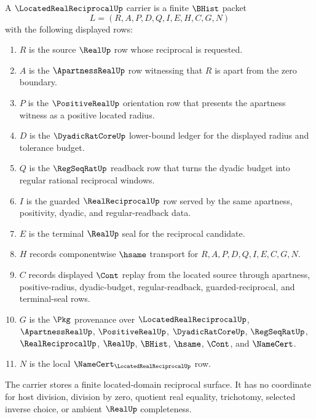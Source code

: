 \begin{definition}
\label{def:located-real-reciprocal-carrier}
A $\LocatedRealReciprocalUp$ carrier is a finite $\BHist$ packet
$$
L=(R,A,P,D,Q,I,E,H,C,G,N)
$$
with the following displayed rows:
\begin{enumerate}
\item $R$ is the source $\RealUp$ row whose reciprocal is requested.
\item $A$ is the $\ApartnessRealUp$ row witnessing that $R$ is apart from the zero boundary.
\item $P$ is the $\PositiveRealUp$ orientation row that presents the apartness witness as a positive located radius.
\item $D$ is the $\DyadicRatCoreUp$ lower-bound ledger for the displayed radius and tolerance budget.
\item $Q$ is the $\RegSeqRatUp$ readback row that turns the dyadic budget into regular rational reciprocal windows.
\item $I$ is the guarded $\RealReciprocalUp$ row served by the same apartness, positivity, dyadic, and regular-readback data.
\item $E$ is the terminal $\RealUp$ seal for the reciprocal candidate.
\item $H$ records componentwise $\hsame$ transport for $R,A,P,D,Q,I,E,C,G,N$.
\item $C$ records displayed $\Cont$ replay from the located source through apartness, positive-radius, dyadic-budget, regular-readback, guarded-reciprocal, and terminal-seal rows.
\item $G$ is the $\Pkg$ provenance over $\LocatedRealReciprocalUp$, $\ApartnessRealUp$, $\PositiveRealUp$, $\DyadicRatCoreUp$, $\RegSeqRatUp$, $\RealReciprocalUp$, $\RealUp$, $\BHist$, $\hsame$, $\Cont$, and $\NameCert$.
\item $N$ is the local $\NameCert_{\LocatedRealReciprocalUp}$ row.
\end{enumerate}
The carrier stores a finite located-domain reciprocal surface. It has no coordinate for host division, division by zero, quotient real equality, trichotomy, selected inverse choice, or ambient $\RealUp$ completeness.
\end{definition}

